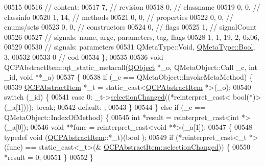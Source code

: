 \begin{DoxyCode}
00515 
00516  \textcolor{comment}{// content:}
00517        7,       \textcolor{comment}{// revision}
00518        0,       \textcolor{comment}{// classname}
00519        0,    0, \textcolor{comment}{// classinfo}
00520        1,   14, \textcolor{comment}{// methods}
00521        0,    0, \textcolor{comment}{// properties}
00522        0,    0, \textcolor{comment}{// enums/sets}
00523        0,    0, \textcolor{comment}{// constructors}
00524        0,       \textcolor{comment}{// flags}
00525        1,       \textcolor{comment}{// signalCount}
00526 
00527  \textcolor{comment}{// signals: name, argc, parameters, tag, flags}
00528        1,    1,   19,    2, 0x06,
00529 
00530  \textcolor{comment}{// signals: parameters}
00531     QMetaType::Void, \hyperlink{a00004_a76a8b016e5ad61faf9062cc387df5016}{QMetaType::Bool},    3,
00532 
00533        0        \textcolor{comment}{// eod}
00534 \};
00535 
00536 \textcolor{keywordtype}{void} QCPAbstractItem::qt\_static\_metacall(\hyperlink{a00059}{QObject} *\_o, QMetaObject::Call \_c, \textcolor{keywordtype}{int} \_id, \textcolor{keywordtype}{void} **\_a)
00537 \{
00538     \textcolor{keywordflow}{if} (\_c == QMetaObject::InvokeMetaMethod) \{
00539         \hyperlink{a00022}{QCPAbstractItem} *\_t = \textcolor{keyword}{static\_cast<}\hyperlink{a00022}{QCPAbstractItem} *\textcolor{keyword}{>}(\_o);
00540         \textcolor{keywordflow}{switch} (\_id) \{
00541         \textcolor{keywordflow}{case} 0: \_t->\hyperlink{a00022_aa5cffb034fc65dbb91c77e02c1c14251}{selectionChanged}((*\textcolor{keyword}{reinterpret\_cast<} \textcolor{keywordtype}{bool}(*)\textcolor{keyword}{>}(\_a[1]))); \textcolor{keywordflow}{break};
00542         \textcolor{keywordflow}{default}: ;
00543         \}
00544     \} \textcolor{keywordflow}{else} \textcolor{keywordflow}{if} (\_c == QMetaObject::IndexOfMethod) \{
00545         \textcolor{keywordtype}{int} *result = \textcolor{keyword}{reinterpret\_cast<}\textcolor{keywordtype}{int} *\textcolor{keyword}{>}(\_a[0]);
00546         \textcolor{keywordtype}{void} **func = \textcolor{keyword}{reinterpret\_cast<}\textcolor{keywordtype}{void} **\textcolor{keyword}{>}(\_a[1]);
00547         \{
00548             \textcolor{keyword}{typedef} void (\hyperlink{a00022}{QCPAbstractItem}::*\_t)(bool );
00549             \textcolor{keywordflow}{if} (*reinterpret\_cast<\_t *>(func) == \textcolor{keyword}{static\_cast<}\_t\textcolor{keyword}{>}(&
      \hyperlink{a00022_aa5cffb034fc65dbb91c77e02c1c14251}{QCPAbstractItem::selectionChanged})) \{
00550                 *result = 0;
00551             \}
00552         \}

\end{DoxyCode}
